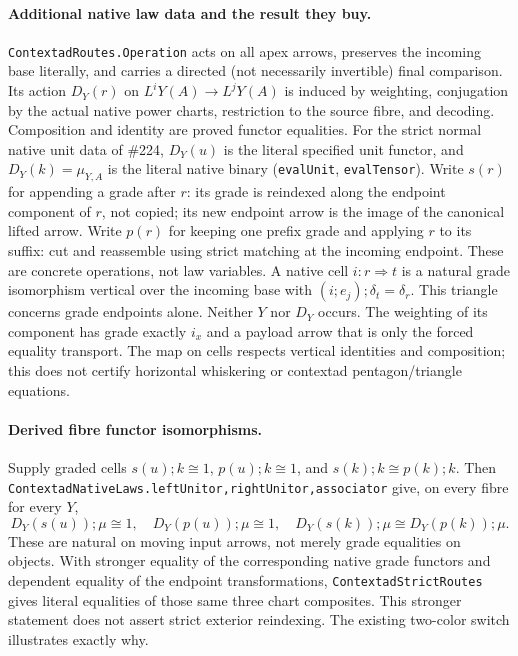 \documentclass{article}
\begin{document}
\paragraph{Additional native law data and the result they buy.} \texttt{ContextadRoutes.Operation} acts on all apex arrows, preserves the incoming base literally, and carries a directed (not necessarily invertible) final comparison. Its action $D_Y(r)$ on $L^iY(A)\to L^jY(A)$ is induced by weighting, conjugation by the actual native power charts, restriction to the source fibre, and decoding. Composition and identity are proved functor equalities. For the strict normal native unit data of \#224, $D_Y(u)$ is the literal specified unit functor, and $D_Y(k)=\mu_{Y,A}$ is the literal native binary (\texttt{evalUnit}, \texttt{evalTensor}).
Write $s(r)$ for appending a grade after $r$: its grade is reindexed along the endpoint component of $r$, not copied; its new endpoint arrow is the image of the canonical lifted arrow. Write $p(r)$ for keeping one prefix grade and applying $r$ to its suffix: cut and reassemble using strict matching at the incoming endpoint. These are concrete operations, not law variables. A native cell $i:r\Rightarrow t$ is a natural grade isomorphism vertical over the incoming base with $(i;e_j);\delta_t=\delta_r$. This triangle concerns grade endpoints alone. Neither $Y$ nor $D_Y$ occurs. The weighting of its component has grade exactly $i_x$ and a payload arrow that is only the forced equality transport. The map on cells respects vertical identities and composition; this does not certify horizontal whiskering or contextad pentagon/triangle equations.
\paragraph{Derived fibre functor isomorphisms.} Supply graded cells
$s(u);k\cong 1$, $p(u);k\cong 1$, and $s(k);k\cong p(k);k$. Then \texttt{ContextadNativeLaws.leftUnitor,rightUnitor,associator} give, on every fibre for every $Y$,
\[
 D_Y(s(u));\mu\cong1,\quad D_Y(p(u));\mu\cong1,\quad
 D_Y(s(k));\mu\cong D_Y(p(k));\mu.
\]
These are natural on moving input arrows, not merely grade equalities on objects. With stronger equality of the corresponding native grade functors and dependent equality of the endpoint transformations, \texttt{ContextadStrictRoutes} gives literal equalities of those same three chart composites. This stronger statement does not assert strict exterior reindexing. The existing two-color switch illustrates exactly why.
\end{document}
